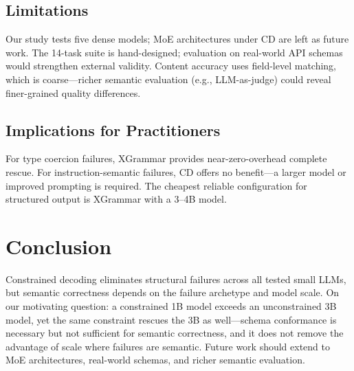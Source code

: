 \documentclass[11pt]{article}
\newcommand{\CD}{Constrained decoding}
\begin{document}
\subsection{Limitations}

Our study tests five dense models; MoE architectures under CD are left as future work.
The 14-task suite is hand-designed; evaluation on real-world API schemas would strengthen external validity.
Content accuracy uses field-level matching, which is coarse---richer semantic evaluation (e.g., LLM-as-judge) could reveal finer-grained quality differences.

\subsection{Implications for Practitioners}

For type coercion failures, XGrammar provides near-zero-overhead complete rescue.
For instruction-semantic failures, CD offers no benefit---a larger model or improved prompting is required.
The cheapest reliable configuration for structured output is XGrammar with a 3--4B model.

\section{Conclusion}
\label{sec:conclusion}

\CD{} eliminates structural failures across all tested small LLMs, but semantic correctness depends on the failure archetype and model scale.
On our motivating question: a constrained 1B model exceeds an unconstrained 3B model, yet the same constraint rescues the 3B as well---schema conformance is necessary but not sufficient for semantic correctness, and it does not remove the advantage of scale where failures are semantic.
Future work should extend to MoE architectures, real-world schemas, and richer semantic evaluation.


\end{document}

